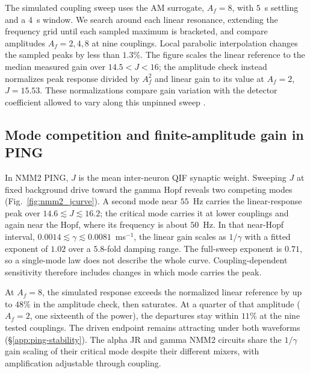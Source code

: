 \documentclass[11pt,a4paper]{article}
\newif\ifjne
\providecommand{\DIFaddtex}[1]{{\protect\color{blue} \sf #1}} %
\providecommand{\DIFaddbegin}{} %
\providecommand{\DIFadd}[1]{\texorpdfstring{\DIFaddtex{#1}}{#1}} %
\begin{document}
The simulated coupling sweep uses the AM surrogate, $A_f=8$, with $5$~s
settling and a $4$~s window. We search around each linear resonance, extending
the frequency grid until each sampled maximum is bracketed, and compare
amplitudes $A_f=2,4,8$ at nine couplings. Local parabolic interpolation changes
the sampled peaks by less than $1.3\%$. The figure scales the linear reference
to the median measured gain over $14.5<J<16$; the amplitude check instead
normalizes peak response divided by $A_f^2$ and linear gain to its value at
$A_f=2$, $J=15.53$. These normalizations compare gain variation with the detector coefficient
allowed to vary along this unpinned sweep\DIFaddbegin \DIFadd{.
}


\fi

\ifjne
\subsection{\DIFadd{Mode competition and finite-amplitude gain in PING}}\label{supp:ping-coupling-results}
\DIFadd{In NMM2 PING, $J$ is the mean inter-neuron QIF synaptic weight.
Sweeping $J$ at fixed background drive toward the gamma Hopf reveals two
competing modes (Fig.~\ref{fig:nmm2_jcurve}). A second mode near $55$~Hz carries
the linear-response peak over $14.6\lesssim J\lesssim16.2$; the critical mode
carries it at lower couplings and again near the Hopf, where its frequency is
about $50$~Hz. In that near-Hopf interval,
$0.0014\lesssim\gamma\lesssim0.0081$~ms$^{-1}$, the linear gain scales as
$1/\gamma$ with a fitted exponent of $1.02$ over a $5.8$-fold damping range.
The full-sweep exponent is $0.71$, so a single-mode law does not describe the
whole curve. Coupling-dependent sensitivity \cite{clusella2023} therefore
includes changes in which mode carries the peak.
}

\DIFadd{At $A_f=8$, the simulated response exceeds the normalized linear reference by
up to $48\%$ in the amplitude check, then saturates. At a quarter of that
amplitude ($A_f=2$, one sixteenth of the power), the departures stay within
$11\%$ at the nine tested couplings. The driven endpoint remains attracting under both waveforms
(\S\ref{app:ping-stability}).
The alpha JR and gamma NMM2 circuits share the $1/\gamma$ gain scaling of their critical mode despite their different
mixers, with amplification adjustable through coupling.
}
\end{document}
